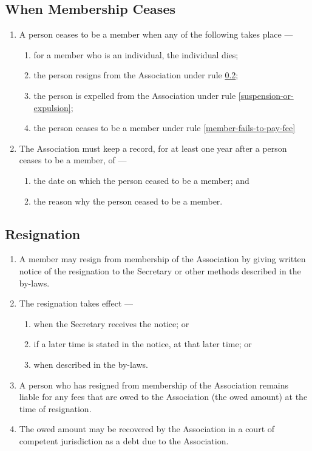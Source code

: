 \documentclass[../constitution.tex]{subfiles}
\begin{document}
\subsection{When Membership Ceases} \label{when-membership-ceases}

\begin{enumerate}

\item A person ceases to be a member when any of the following takes place ---

  \begin{enumerate}
  
  \item for a member who is an individual, the individual dies;
  \item the person resigns from the Association under rule \ref{resignation};
  \item the person is expelled from the Association under rule \ref{suspension-or-expulsion};
  \item the person ceases to be a member under rule \ref{member-fails-to-pay-fee}
  \end{enumerate}
\item The Association must keep a record, for at least one year after a person ceases to be a member, of ---

  \begin{enumerate}
  
  \item the date on which the person ceased to be a member; and
  \item the reason why the person ceased to be a member.
  \end{enumerate}
\end{enumerate}


\subsection{Resignation} \label{resignation}

\begin{enumerate}

\item A member may resign from membership of the Association by giving written notice of the resignation to the Secretary or other methods described in the by-laws.
\item The resignation takes effect ---
  \begin{enumerate}
  \item when the Secretary receives the notice; or
  \item if a later time is stated in the notice, at that later time; or
  \item when described in the by-laws.
  \end{enumerate}
\item A person who has resigned from membership of the Association remains liable for any fees that are owed to the Association (the owed amount) at the time of resignation.
\item The owed amount may be recovered by the Association in a court of competent jurisdiction as a debt due to the Association.
\end{enumerate}
\end{document}
